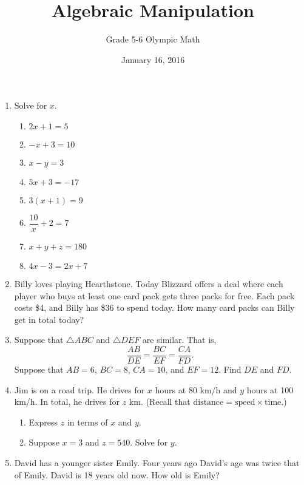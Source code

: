 \documentclass[12pt,letterpaper]{article}
\author{Grade 5-6 Olympic Math}
\title{Algebraic Manipulation}
\date{January 16, 2016}
\begin{document}
	\maketitle
	\begin{enumerate}
		\item Solve for $x$.
		\begin{enumerate}
			\item $2x+1=5$
			\item $-x+3=10$
			\item $x-y=3$
			\item $5x+3=-17$
			\item $3(x+1)=9$
			\item $\dfrac{10}{x}+2=7$\\
			\item $x+y+z=180$
			\item $4x-3=2x+7$
		\end{enumerate}
		
		\item Billy loves playing Hearthstone. Today Blizzard offers a deal where each player who buys at least one card pack gets three packs for free. Each pack costs \$4, and Billy has \$36 to spend today. How many card packs can Billy get in total today?
		
		\item Suppose that $\triangle ABC$ and $\triangle DEF$ are similar. That is,
		\[\frac{AB}{DE}=\frac{BC}{EF}=\frac{CA}{FD}.\]
		Suppose that $AB=6$, $BC=8$, $CA=10$, and $EF=12$. Find $DE$ and $FD$.
		
		\item Jim is on a road trip. He drives for $x$ hours at 80 km/h and $y$ hours at 100 km/h. In total, he drives for $z$ km. (Recall that $\text{distance}=\text{speed}\times\text{time}$.)
		\begin{enumerate}
			\item Express $z$ in terms of $x$ and $y$.
			\item Suppose $x=3$ and $z=540$. Solve for $y$.
		\end{enumerate}
		
		\item David has a younger sister Emily. Four years ago David's age was twice that of Emily. David is 18 years old now. How old is Emily?
	\end{enumerate}
\end{document}
